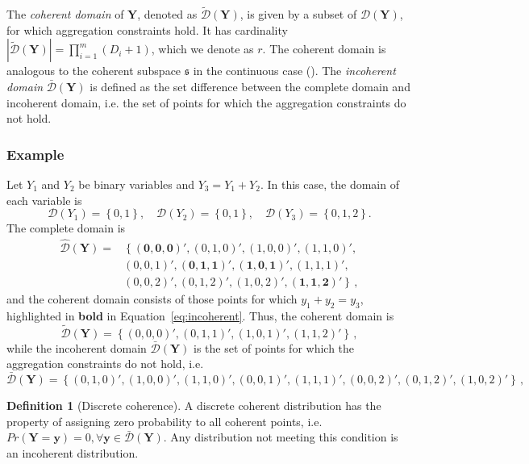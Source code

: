 \documentclass[a4paper,review,11pt,authoryear]{elsarticle}
\newcommand{\bY}{\mathbf{Y}}
\theoremstyle{definition}
\newtheorem{definition}{Definition}[section]
\begin{document}
The \textit{coherent domain} of $\bY$, denoted as $\tilde{\mathcal D}(\bY)$, is given by a subset of $\hat{\mathcal D}(\bY)$, for which aggregation constraints hold.
It has cardinality $|\tilde{\mathcal D}(\bY)|=\prod\limits_{i=1}^{m} (D_i+1)$, which we denote as $r$.
The coherent domain is analogous to the coherent subspace $\mathfrak{s}$ in the continuous case (\citealp{panagiotelisProbabilisticForecastReconciliation2022}). The \textit{incoherent domain} $\bar{\mathcal D}(\bY)$ is defined as the set difference between the complete domain and incoherent domain, i.e. the set of points for which the aggregation constraints do not hold.

  \subsubsection*{\textbf{Example}}
  \label{sec:example}

  Let $Y_1$ and $Y_2$ be binary variables and $Y_3=Y_1+Y_2$. In this case, the domain of each variable is
  \[
    \mathcal{D}(Y_1)=\left\{0,1\right\},\quad
    \mathcal{D}(Y_2)=\left\{0,1\right\},\quad
    \mathcal{D}(Y_3)=\left\{0,1,2\right\}.
  \]
  The complete domain is
  \begin{equation}
  \begin{aligned}
  \hat{\mathcal D}(\bY)=&\left\{\mathbf{(0,0,0)'},(0,1,0)',(1,0,0)',(1,1,0)',\right.\\
  &\left.(0,0,1)',\mathbf{(0,1,1)'},\mathbf{(1,0,1)'},(1,1,1)',\right.\\
  &\left.(0,0,2)',(0,1,2)',(1,0,2)',\mathbf{(1,1,2)'}\right\}\,,
  \end{aligned}
  \label{eq:incoherent}
  \end{equation}
  and the coherent domain consists of those points for which $y_1+y_2=y_3$, highlighted in \textbf{bold} in Equation~\eqref{eq:incoherent}. Thus, the coherent domain is
  \[
      \tilde{\mathcal D}(\bY)=\left\{(0,0,0)',(0,1,1)',(1,0,1)',(1,1,2)'\right\}\,,
  \]
  while the incoherent domain $\bar{\mathcal D}(\bY)$ is the set of points for which the aggregation constraints do not hold, i.e.
    \[
  \bar{\mathcal D}(\bY)=\left\{(0,1,0)',(1,0,0)',(1,1,0)',(0,0,1)',
  (1,1,1)',(0,0,2)',(0,1,2)',(1,0,2)'
  \right\}\,,
  \]
  
  \begin{definition}[Discrete coherence]
  
  A discrete coherent distribution has the property of assigning zero probability to all coherent points, i.e. $Pr(\mathbf{Y}=\bm{y})=0, \forall \bm{y}\in \bar{\mathcal D}(\bY)$. Any distribution not meeting this condition is an incoherent distribution.

  \end{definition}
\end{document}
